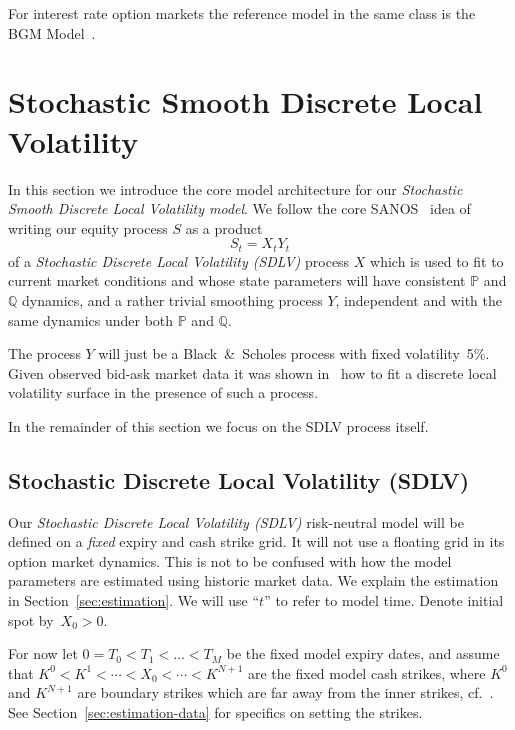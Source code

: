\documentclass[smallextended,envcountsame,envcountsect]{svjour3}
\newcommand{\Q}{\mathbb Q}
\newcommand{\PP}{\mathbb P}
\begin{document}
For interest rate option markets the reference model in the same class is the BGM Model~\citep{BGM}. 

\section{Stochastic Smooth Discrete Local Volatility}

In this section we introduce the core model architecture for our \emph{Stochastic 
Smooth Discrete Local Volatility model}.
We follow the core SANOS~\citep{SANOS2026} idea of writing our equity process $S$ as a product
\begin{equation}
 \label{eq:S} 
  S_t = X_t Y_t 
\end{equation}
of a \emph{Stochastic Discrete Local Volatility (SDLV)} process $X$ which is used to fit to current market conditions and 
whose state parameters will have consistent $\PP$ and $\Q$ dynamics, and a rather trivial smoothing process $Y$, independent and with the same dynamics under both $\PP$ and $\Q$.

The process $Y$ will just be a Black~\&~Scholes process with fixed volatility~5\%. Given observed bid-ask market data it was shown in~\citet{SANOS2026} how to fit
a discrete local volatility surface in the presence of such a process. 

In the remainder of this section we focus on the SDLV process itself.

\subsection{Stochastic Discrete Local Volatility (SDLV)}

Our \emph{Stochastic Discrete Local Volatility (SDLV)} risk-neutral model will be defined on a \emph{fixed} expiry and cash strike grid. It will not use a floating grid in its option market dynamics. This is not to be confused with 
how the model parameters are estimated using historic market data. We explain the estimation in Section~\ref{sec:estimation}. We will use ``$t$'' to refer to 
model time. Denote initial spot by~$X_0>0$.

For now let $0=T_0<T_1<\dots<T_M$ be the fixed model expiry dates, and assume that $K^0<K^1<\cdots<X_0<\cdots<K^{N+1}$ are the fixed model cash strikes, where 
$K^0$ and $K^{N+1}$
are boundary strikes which are far away from the inner strikes, cf.~\citep{SANOS2026}. See Section~\ref{sec:estimation-data} for specifics on setting the strikes. %
\end{document}
